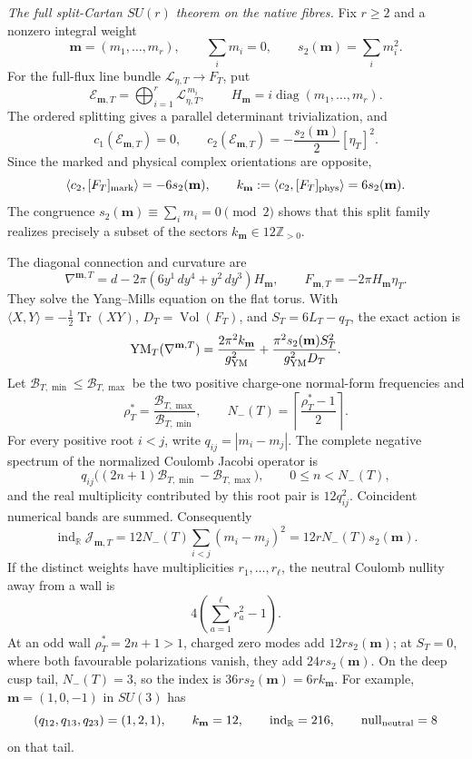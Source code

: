 \documentclass[10pt,letterpaper]{article}
\begin{document}
\medskip\noindent
\textit{The full split-Cartan \(SU(r)\) theorem on the native fibres.}
Fix \(r\ge2\) and a nonzero integral weight
\[
 \mathbf m=(m_1,\ldots,m_r),\qquad
 \sum_i m_i=0,\qquad s_2(\mathbf m)=\sum_i m_i^2.
\]
For the full-flux line bundle \(\mathscr L_{\eta,T}\to F_T\), put
\[
 \mathscr E_{\mathbf m,T}
 =\bigoplus_{i=1}^r\mathscr L_{\eta,T}^{\,m_i},
 \qquad
 H_{\mathbf m}=i\operatorname{diag}(m_1,\ldots,m_r).
\]
The ordered splitting gives a parallel determinant trivialization, and
\[
 c_1(\mathscr E_{\mathbf m,T})=0,\qquad
 c_2(\mathscr E_{\mathbf m,T})
 =-\frac{s_2(\mathbf m)}2[\eta_T]^2.
\]
Since the marked and physical complex orientations are opposite,
\[
 \left\langle c_2,[F_T]_{\rm mark}\right\rangle=-6s_2(\mathbf m),
 \qquad
 k_{\mathbf m}:=
 \left\langle c_2,[F_T]_{\rm phys}\right\rangle=6s_2(\mathbf m).
\]
The congruence \(s_2(\mathbf m)\equiv\sum_i m_i=0\pmod2\) shows that this
split family realizes precisely a subset of the sectors
\(k_{\mathbf m}\in12\mathbb Z_{>0}\).

The diagonal connection and curvature are
\[
 \nabla^{\mathbf m,T}
 =d-2\pi(6y^1\,dy^4+y^2\,dy^3)H_{\mathbf m},
 \qquad
 F_{\mathbf m,T}=-2\pi H_{\mathbf m}\eta_T.
\]
They solve the Yang--Mills equation on the flat torus.  With
\(\langle X,Y\rangle=-\tfrac12\operatorname{Tr}(XY)\),
\(D_T=\operatorname{Vol}(F_T)\), and \(S_T=6L_T-q_T\), the exact action is
\[
 \operatorname{YM}_T(\nabla^{\mathbf m,T})
 =\frac{2\pi^2k_{\mathbf m}}{g_{\rm YM}^2}
 +\frac{\pi^2s_2(\mathbf m)S_T^2}{g_{\rm YM}^2D_T}.
\]
Let \(\mathcal B_{T,\min}\le\mathcal B_{T,\max}\) be the two positive
charge-one normal-form frequencies and
\[
 \rho_T^*=\frac{\mathcal B_{T,\max}}{\mathcal B_{T,\min}},\qquad
 N_-(T)=\left\lceil\frac{\rho_T^*-1}{2}\right\rceil .
\]
For every positive root \(i<j\), write \(q_{ij}=|m_i-m_j|\).  The complete
negative spectrum of the normalized Coulomb Jacobi operator is
\[
 q_{ij}\bigl((2n+1)\mathcal B_{T,\min}
                    -\mathcal B_{T,\max}\bigr),
 \qquad 0\le n<N_-(T),
\]
and the real multiplicity contributed by this root pair is
\(12q_{ij}^2\).  Coincident numerical bands are summed.  Consequently
\[
 \operatorname{ind}_{\mathbb R}\mathcal J_{\mathbf m,T}
 =12N_-(T)\sum_{i<j}(m_i-m_j)^2
 =12rN_-(T)s_2(\mathbf m).
\]
If the distinct weights have multiplicities \(r_1,\ldots,r_\ell\), the
neutral Coulomb nullity away from a wall is
\[
 4\left(\sum_{a=1}^{\ell}r_a^2-1\right).
\]
At an odd wall \(\rho_T^*=2n+1>1\), charged zero modes add
\(12rs_2(\mathbf m)\); at \(S_T=0\), where both favourable polarizations
vanish, they add \(24rs_2(\mathbf m)\).  On the deep cusp tail,
\(N_-(T)=3\), so the index is \(36rs_2(\mathbf m)=6rk_{\mathbf m}\).
For example, \(\mathbf m=(1,0,-1)\) in \(SU(3)\) has
\[
 (q_{12},q_{13},q_{23})=(1,2,1),\qquad
 k_{\mathbf m}=12,\qquad
 \operatorname{ind}_{\mathbb R}=216,\qquad
 \operatorname{null}_{\rm neutral}=8
\]
on that tail.
\end{document}
